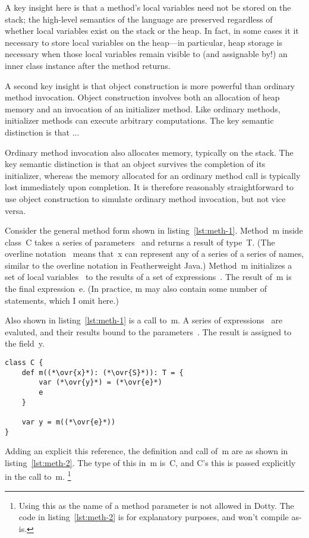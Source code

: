A key insight here is that a method's local variables need not be stored on the stack; the high-level semantics of the language are preserved regardless of whether local variables exist on the stack or the heap. In fact, in some cases it it necessary to store local variables on the heap---in particular, heap storage is necessary when those local variables remain visible to (and assignable by!) an inner class instance after the method returns.

A second key insight is that object construction is more powerful than ordinary method invocation. Object construction involves both an allocation of heap memory and an invocation of an initializer method. Like ordinary methods, initializer methods can execute arbitrary computations. The key semantic distinction is that ...

Ordinary method invocation also allocates memory, typically on the stack. The key semantic distinction is that an object survives the completion of its initializer, whereas the memory allocated for an ordinary method call is typically lost immediately upon completion. It is therefore reasonably straightforward to use object construction to simulate ordinary method invocation, but not vice versa.

Consider the general method form shown in listing~\ref{lst:meth-1}. Method~{\cd m} inside class~{\cd C} takes a series of parameters~{\cd {}} and returns a result of type~{\cd T}. (The overline notation~{\cd {}} means that~{\cd x} can represent any of a series of a series of names, similar to the overline notation in Featherweight Java.) Method~{\cd m} initializes a set of local variables~{\cd {}} to the results of a set of expressions~{\cd {}}. The result of~{\cd m} is the final expression~{\cd e}. (In practice, {\cd m} may also contain some number of statements, which I omit here.)

Also shown in listing~\ref{lst:meth-1} is a call to~{\cd m}. A series of expressions~{\cd {}} are evaluted, and their results bound to the parameters~{\cd {}}. The result is assigned to the field~{\cd y}.

\begin{lstlisting}[float=htbp, caption={Method Transformation 1}, label={lst:meth-1}]
class C {
	def m((*\ovr{x}*): (*\ovr{S}*)): T = {
		var (*\ovr{y}*) = (*\ovr{e}*)
		e
	}

	var y = m((*\ovr{e}*))
}
\end{lstlisting}

Adding an explicit {\cd this} reference, the definition and call of~{\cd m} are as shown in listing~\ref{lst:meth-2}. The type of {\cd this} in~{\cd m} is~{\cd C}, and \mbox{{\cd C}'s} {\cd this} is passed explicitly in the call to~{\cd m}.
\footnote{Using {\cdf this} as the name of a method parameter is not allowed in Dotty. The code in listing~\ref{lst:meth-2} is for explanatory purposes, and won't compile as-is.}

